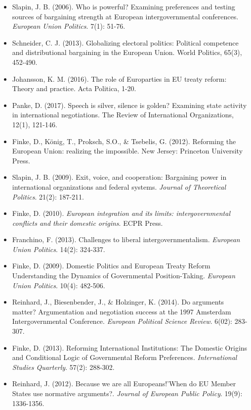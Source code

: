 \begin{itemize}
	\item Slapin, J. B. (2006). Who is powerful? Examining preferences and testing sources of bargaining strength at European intergovernmental conferences. \textit{European Union Politics}. 7(1): 51-76.
	\item Schneider, C. J. (2013). Globalizing electoral politics: Political competence and distributional bargaining in the European Union. World Politics, 65(3), 452-490.
	\item Johansson, K. M. (2016). The role of Europarties in EU treaty reform: Theory and practice. Acta Politica, 1-20.
	\item Panke, D. (2017). Speech is silver, silence is golden? Examining state activity in international negotiations. The Review of International Organizations, 12(1), 121-146.
	\item Finke, D., K{\"o}nig, T., Proksch, S.O., \& Tsebelis, G. (2012). Reforming the European Union: realizing the impossible. New Jersey: Princeton University Press.
	\item Slapin, J. B. (2009). Exit, voice, and cooperation: Bargaining power in international organizations and federal systems. \textit{Journal of Theoretical Politics}. 21(2): 187-211.
	\item Finke, D. (2010). \textit{European integration and its limits: intergovernmental conflicts and their domestic origins}. ECPR Press.
	\item Franchino, F. (2013). Challenges to liberal intergovernmentalism. \textit{European Union Politics}. 14(2): 324-337.
	\item Finke, D. (2009). Domestic Politics and European Treaty Reform Understanding the Dynamics of Governmental Position-Taking. \textit{European Union Politics}. 10(4): 482-506.
	\item Reinhard, J., Biesenbender, J., \& Holzinger, K. (2014). Do arguments matter? Argumentation and negotiation success at the 1997 Amsterdam Intergovernmental Conference. \textit{European Political Science Review}. 6(02): 283-307.
	\item Finke, D. (2013). Reforming International Institutions: The Domestic Origins and Conditional Logic of Governmental Reform Preferences. \textit{International Studies Quarterly}. 57(2): 288-302.
	\item Reinhard, J. (2012). Because we are all Europeans!’When do EU Member States use normative arguments?. \textit{Journal of European Public Policy}. 19(9): 1336-1356.
\end{itemize}

